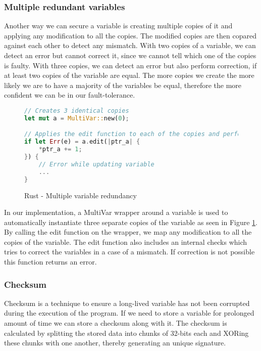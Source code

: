\subsubsection{Multiple redundant variables}

Another way we can secure a variable is creating multiple copies of it and applying any modification to all the copies. The modified copies are then copared against each other to detect any mismatch. With two copies of a variable, we can detect an error but cannot correct it, since we cannot tell which one of the copies is faulty. With three copies, we can detect an error but also perform correction, if at least two copies of the variable are equal. The more copies we create the more likely we are to have a majority of the variables be equal, therefore the more confident we can be in our fault-tolerance.

\begin{figure}[!h]
\begin{lstlisting}[language=Rust]
// Creates 3 identical copies
let mut a = MultiVar::new(0);

// Applies the edit function to each of the copies and performs equality check
if let Err(e) = a.edit(|ptr_a| {
    *ptr_a += 1;
}) {
    // Error while updating variable
    ...
}
\end{lstlisting}
\caption{Rust - Multiple variable redundancy}
\label{fig:multivar}
\end{figure}

In our implementation, a MultiVar wrapper around a variable is used to automatically instantiate three separate copies of the variable as seen in Figure \ref{fig:multivar}. By calling the edit function on the wrapper, we map any modification to all the copies of the variable. The edit function also includes an internal checks which tries to correct the variables in a case of a mismatch. If correction is not possible this function returns an error.

\subsubsection{Checksum} \label{sec:checksum}

Checksum is a technique to ensure a long-lived variable has not been corrupted during the execution of the program. If we need to store a variable for prolonged amount of time we can store a checksum along with it. The checksum is calculated by splitting the stored data into chunks of 32-bits each and XORing these chunks with one another, thereby generating an unique signature.

